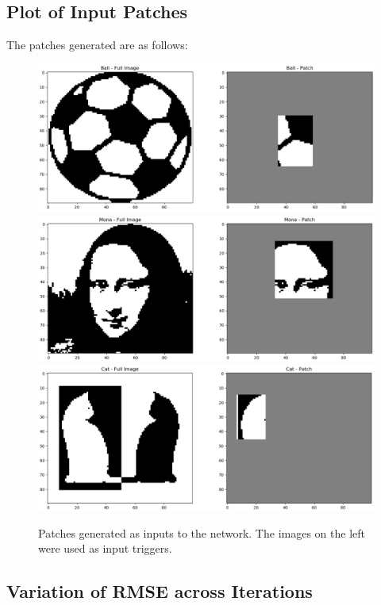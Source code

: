 \documentclass[12pt,a4paper]{article}
\begin{document}
\subsection{Plot of Input Patches}
The patches generated are as follows:
\begin{figure}[H]
\centering
\includegraphics[scale=0.4]{images/ball_patch.png}
\includegraphics[scale=0.4]{images/mona_patch.png}
\includegraphics[scale=0.4]{images/cat_patch.png}
\caption{Patches generated as inputs to the network. The images on the left were used as input triggers.}
\end{figure}

\break
\subsection{Variation of RMSE across Iterations}
\end{document}
